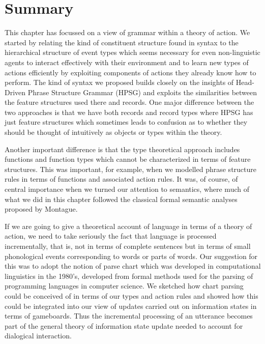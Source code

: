   



  
\section{Summary}


This chapter has focussed on a view of grammar within a theory of
action.  We started by relating the kind of constituent structure
found in syntax to the hierarchical structure of event types which
seems necessary for even non-linguistic agents to interact effectively
with their environment and to learn new types of actions efficiently
by exploiting components of actions they already know how to perform.
The kind of syntax we proposed builds closely on the insights of
Head-Driven Phrase Structure Grammar (HPSG) and exploits the
similarities between the feature structures used there and records.
One major difference between the two approaches is that we have both
records and record types where HPSG has just feature structures which
sometimes leads to confusion as to whether they should be thought of intuitively
as objects or types within the theory.

Another important difference
is that the type theoretical approach includes functions and function
types which cannot be characterized in terms of feature structures.
This was important, for example, when we modelled phrase structure
rules in terms of functions and associated action rules.  It was, of
course, of central importance when we turned our attention to
semantics, where much of what we did in this chapter followed the
classical formal semantic analyses proposed by Montague.

If we are going to give a theoretical account of language in terms of
a theory of action, we need to take seriously the fact that language
is processed incrementally, that is, not in terms of complete
sentences but in terms of small phonological events corresponding to
words or parts of words.  Our suggestion for this was to adopt the
notion of parse chart which was developed in computational linguistics
in the 1980's, developed from formal methods used for the parsing of
programming languages in computer science.  We sketched how chart
parsing could be conceived of in terms of our types and action rules
and showed how this could be integrated into our view of updates
carried out on information states in terms of gameboards.  Thus the
incremental processing of an utterance becomes part of the general
theory of information state update needed to account for dialogical interaction.

